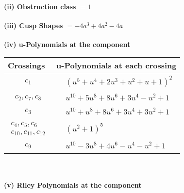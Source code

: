 \documentclass[1p]{elsarticle_modified}
\theoremstyle{definition}
\begin{document}
\flushleft \textbf{(ii) Obstruction class $= 1$}\\~\\
\flushleft \textbf{(iii) Cusp Shapes $= -4 a^3+4 a^2-4 a$}\\~\\
\newpage\renewcommand{\arraystretch}{1}
\flushleft \textbf{(iv) u-Polynomials at the component}\newline \\
\begin{tabular}{m{50pt}|m{274pt}}
Crossings & \hspace{64pt}u-Polynomials at each crossing \\
\hline $$\begin{aligned}c_{1}\end{aligned}$$&$\begin{aligned}
&(u^5+u^4+2 u^3+u^2+u+1)^2
\end{aligned}$\\
\hline $$\begin{aligned}c_{2},c_{7},c_{8}\end{aligned}$$&$\begin{aligned}
&u^{10}+5 u^8+8 u^6+3 u^4- u^2+1
\end{aligned}$\\
\hline $$\begin{aligned}c_{3}\end{aligned}$$&$\begin{aligned}
&u^{10}+u^8+8 u^6+3 u^4+3 u^2+1
\end{aligned}$\\
\hline $$\begin{aligned}c_{4},c_{5},c_{6}\\c_{10},c_{11},c_{12}\end{aligned}$$&$\begin{aligned}
&(u^2+1)^5
\end{aligned}$\\
\hline $$\begin{aligned}c_{9}\end{aligned}$$&$\begin{aligned}
&u^{10}-3 u^8+4 u^6- u^4- u^2+1
\end{aligned}$\\
\hline
\end{tabular}\\~\\
\newpage\renewcommand{\arraystretch}{1}
\flushleft \textbf{(v) Riley Polynomials at the component}\newline \\
\end{document}
